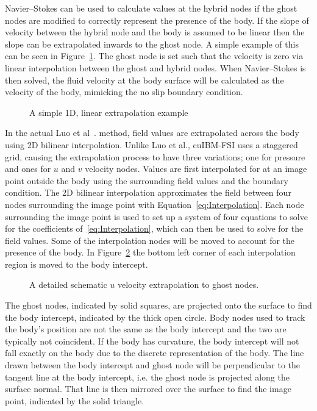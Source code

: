 \documentclass[onehalf,11pt]{beavtex}
\begin{document}
Navier--Stokes can be used to calculate values at the hybrid nodes if the ghost nodes are modified to correctly represent the presence of the body. 
If the slope of velocity between the hybrid node and the body is assumed to be linear then the slope can be extrapolated inwards to the ghost node. 
A simple example of this can be seen in Figure~\ref{Fig: Simple Interpolation}. 
The ghost node is set such that the velocity is zero via linear interpolation between the ghost and hybrid nodes. 
When Navier--Stokes is then solved, the fluid velocity at the body surface will be calculated as the velocity of the body, mimicking the no slip boundary condition. 
\begin{figure}[!htb]
	\centering
	
	\caption{A simple 1D, linear extrapolation example}
	\label{Fig: Simple Interpolation}
\end{figure}
In the actual Luo et al~\cite{Luo:2012gx}. method, field values are extrapolated across the body using 2D bilinear interpolation.
Unlike Luo et al., cuIBM-FSI uses a staggered grid, causing the extrapolation process to have three variations; one for pressure and ones for $u$ and $v$ velocity nodes. 
Values are first interpolated for at an image point outside the body using the surrounding field values and the boundary condition. 
The 2D bilinear interpolation approximates the field between four nodes surrounding the image point with Equation~\eqref{eq:Interpolation}. 
Each node surrounding the image point is used to set up a system of four equations to solve for the coefficients of~\eqref{eq:Interpolation}, which can then be used to solve for the field values. 
Some of the interpolation nodes will be moved to account for the presence of the body.
In Figure~\ref{fig:Ghost node extrapolation} the bottom left corner of each interpolation region is moved to the body intercept.
\begin{figure}[htb]
	\centering
	
	\caption{A detailed schematic $u$ velocity extrapolation to ghost nodes.}
	\label{fig:Ghost node extrapolation}
\end{figure}

The ghost nodes, indicated by solid squares, are projected onto the surface to find the body intercept, indicated by the thick open circle. 
Body nodes used to track the body's position are not the same as the body intercept and the two are typically not coincident. 
If the body has curvature, the body intercept will not fall exactly on the body due to the discrete representation of the body. 
The line drawn between the body intercept and ghost node will be perpendicular to the tangent line at the body intercept, i.e. the ghost node is projected along the surface normal. 
That line is then mirrored over the surface to find the image point, indicated by the solid triangle. 
\end{document}

